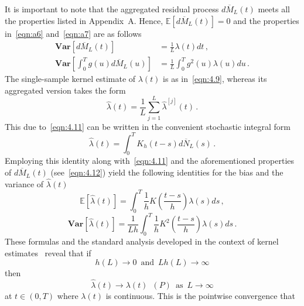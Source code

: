 \documentclass[lettersize,journal,onecolumn]{IEEEtran}
\theoremstyle{definition}
\newcommand{\E}[1]{\mathbb{E}\left[#1\right]}
\newcommand{\Var}[1]{\mathbf{Var}\left[#1\right]}
\begin{document}
It is important to note that the aggregated residual process $d\overline{M}_{L}(t)$ 
meets all the properties listed in Appendix~A. Hence, $\E{d\overline{M}_{L}(t)}=0$ and
the properties in~\eqref{eqn:a6} and~\eqref{eqn:a7} are as follows
\begin{equation}
	\begin{aligned}
		\Var{d\overline{M}_{L}(t)} &= 
		\frac{1}{L} \lambda(t)dt
		\,,\\
		\Var{\int_{0}^{T} g(u) d\overline{M}_{L}(u)} &= 
		\frac{1}{L} \int_{0}^{T} g^{2}(u) \lambda(u)du
		\,.
	\end{aligned}
	\label{eqn:4.12}
\end{equation}
The single-sample kernel estimate of $\lambda(t)$ is as in~\eqref{eqn:4.9},
whereas its aggregated version takes the form
\begin{equation}
	\widehat{\lambda}(t) = 
	\frac{1}{L} \sum_{j=1}^{L} \widehat{\lambda}^{[j]}(t)
	\label{eqn:4.13}\,.
\end{equation}
This due to~\eqref{eqn:4.11} can be written in the convenient stochastic integral form
\begin{equation}
	\widehat{\lambda}(t) = 
	\int_{0}^{T} K_{h}\left(t-s\right) d\overline{N}_{L}(s)
	\label{eqn:4.14}\,.
\end{equation}
Employing this identity along with~\eqref{eqn:4.11} and the aforementioned properties 
of $d\overline{M}_{L}(t)$ (see~\eqref{eqn:4.12})  yield the following identities
for the bias and the variance
of $\widehat{\lambda}(t)$
\begin{equation}
	\E{\widehat{\lambda}(t)} = 
	\int_{0}^{T} \frac{1}{h} K\left(\frac{t-s}{h}\right) \lambda(s)ds
	\label{eqn:4.15}\,,
\end{equation}
\begin{equation}
	\Var{\widehat{\lambda}(t)} = 
	\frac{1}{Lh}
	\int_{0}^{T} \frac{1}{h} K^{2}\left(\frac{t-s}{h}\right) \lambda(s)ds
	\label{eqn:4.16}\,.
\end{equation}
These formulas and the standard analysis developed in the context of kernel 
estimates~\cite{wand1994kernel, grebpaw08} reveal that if
\begin{equation*}
	h(L) \to 0
	\enspace \text{and}
	\enspace Lh(L) \to \infty
\end{equation*}
then
\begin{equation}
	\widehat{\lambda}(t) \to \lambda(t)
	\enspace (P)
	\enspace \text{as}
	\enspace L \to \infty
	\label{eqn:4.17}
\end{equation}
at $t\in(0,T)$ where $\lambda(t)$ is continuous. This is the pointwise convergence that 
\end{document}
